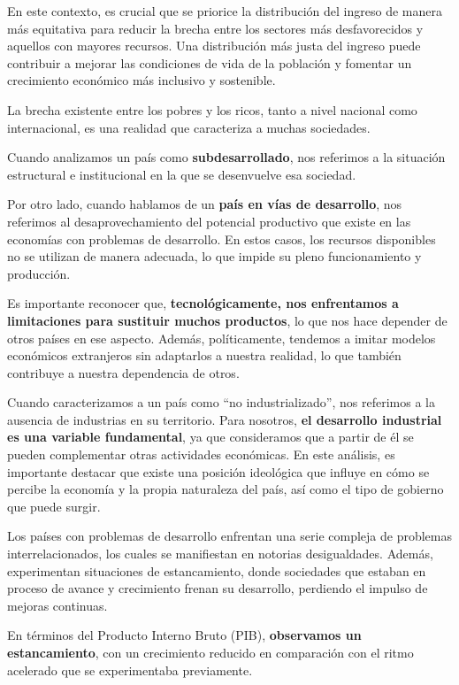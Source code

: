 \documentclass[
  letterpaper,
  DIV=11,
  numbers=noendperiod]{scrartcl}
\begin{document}
En este contexto, es crucial que se priorice la distribución del ingreso
de manera más equitativa para reducir la brecha entre los sectores más
desfavorecidos y aquellos con mayores recursos. Una distribución más
justa del ingreso puede contribuir a mejorar las condiciones de vida de
la población y fomentar un crecimiento económico más inclusivo y
sostenible.

La brecha existente entre los pobres y los ricos, tanto a nivel nacional
como internacional, es una realidad que caracteriza a muchas sociedades.

Cuando analizamos un país como \textbf{subdesarrollado}, nos referimos a
la situación estructural e institucional en la que se desenvuelve esa
sociedad.

Por otro lado, cuando hablamos de un \textbf{país en vías de
desarrollo}, nos referimos al desaprovechamiento del potencial
productivo que existe en las economías con problemas de desarrollo. En
estos casos, los recursos disponibles no se utilizan de manera adecuada,
lo que impide su pleno funcionamiento y producción.

Es importante reconocer que, \textbf{tecnológicamente, nos enfrentamos a
limitaciones para sustituir muchos productos}, lo que nos hace depender
de otros países en ese aspecto. Además, políticamente, tendemos a imitar
modelos económicos extranjeros sin adaptarlos a nuestra realidad, lo que
también contribuye a nuestra dependencia de otros.

Cuando caracterizamos a un país como ``no industrializado'', nos
referimos a la ausencia de industrias en su territorio. Para nosotros,
\textbf{el desarrollo industrial es una variable fundamental}, ya que
consideramos que a partir de él se pueden complementar otras actividades
económicas. En este análisis, es importante destacar que existe una
posición ideológica que influye en cómo se percibe la economía y la
propia naturaleza del país, así como el tipo de gobierno que puede
surgir.

Los países con problemas de desarrollo enfrentan una serie compleja de
problemas interrelacionados, los cuales se manifiestan en notorias
desigualdades. Además, experimentan situaciones de estancamiento, donde
sociedades que estaban en proceso de avance y crecimiento frenan su
desarrollo, perdiendo el impulso de mejoras continuas.

En términos del Producto Interno Bruto (PIB), \textbf{observamos un
estancamiento}, con un crecimiento reducido en comparación con el ritmo
acelerado que se experimentaba previamente.
\end{document}
